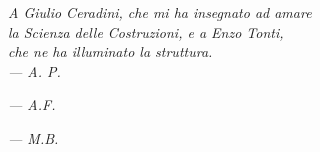 \clearpage
\thispagestyle{empty}
\vspace*{3cm}

\begin{flushright}
	\itshape
	A Giulio Ceradini, che mi ha insegnato ad amare\\
	la Scienza delle Costruzioni, e a Enzo Tonti,\\
	che ne ha illuminato la struttura.\\[0.5ex]
	\upshape--- A. P.
	
	\bigskip\bigskip
	
	\itshape
	\upshape--- A.F.
	
	\bigskip\bigskip
	
	\itshape
	\upshape--- M.B.
\end{flushright}

\clearpage